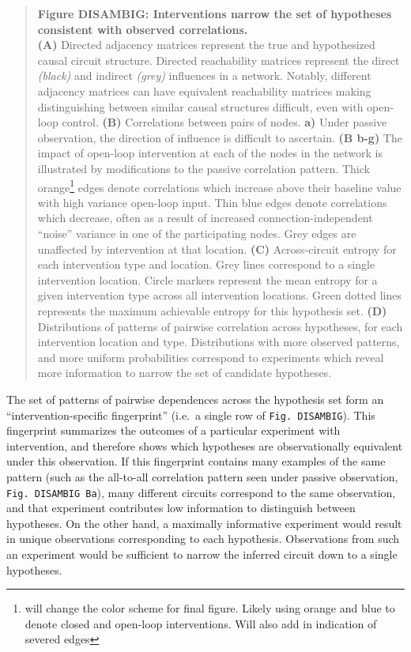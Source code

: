\documentclass{article}
\begin{document}
\begin{quote}
\textbf{Figure DISAMBIG: Interventions narrow the set of hypotheses consistent with observed correlations.}\\
\textbf{(A)} Directed adjacency matrices represent the true and hypothesized causal circuit structure. Directed reachability matrices represent the direct \emph{(black)} and indirect \emph{(grey)}
influences in a network. Notably, different adjacency matrices can have equivalent reachability matrices making distinguishing between similar causal structures difficult, even with open-loop control. \textbf{(B)}
Correlations between pairs of nodes. \textbf{a)} Under passive observation, the direction of influence is difficult to ascertain.
\textbf{(B b-g)} The impact of open-loop intervention at each of the nodes in the network is illustrated by modifications to the passive correlation pattern. Thick orange\footnote{will change the color scheme
  for final figure. Likely using orange and blue to denote closed and
  open-loop interventions. Will also add in indication of severed edges}
edges denote correlations which increase above their baseline value with high variance open-loop input. Thin blue edges denote correlations which decrease, often as a result of increased connection-independent
``noise'' variance in one of the participating nodes. Grey edges are unaffected by intervention at that location. \textbf{(C)} Across-circuit entropy for each intervention type and location. Grey lines correspond to a single intervention location. Circle markers represent the mean entropy for a given intervention type across all intervention locations. Green dotted lines represents the maximum achievable entropy for this hypothesis set. \textbf{(D)} Distributions of patterns of pairwise correlation across hypotheses, for each intervention location and type. Distributions with more observed patterns, and more uniform probabilities correspond to experiments which reveal more information to narrow the set of candidate hypotheses.
\end{quote}

The set of patterns of pairwise dependences across the hypothesis set form an ``intervention-specific fingerprint'' (i.e.~a single row of
\texttt{Fig.\ DISAMBIG}). This fingerprint summarizes the outcomes of a particular experiment with intervention, and therefore shows which hypotheses are observationally equivalent under this observation. If this fingerprint contains many examples of the same pattern (such as the all-to-all correlation pattern seen under passive observation,
\texttt{Fig.\ DISAMBIG\ Ba}), many different circuits correspond to the same observation, and that experiment contributes low information to distinguish between hypotheses. On the other hand, a maximally informative experiment would result in unique observations corresponding to each hypothesis. Observations from such an experiment would be sufficient to narrow the inferred circuit down to a single hypotheses.
\end{document}
